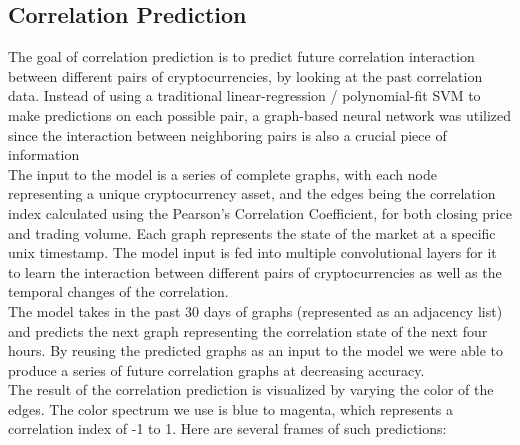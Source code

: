 \documentclass[11pt]{article}
\begin{document}
\subsection{Correlation Prediction}
The goal of correlation prediction is to predict future correlation interaction between different pairs of cryptocurrencies, by looking at the past correlation data. Instead of using a traditional linear-regression / polynomial-fit SVM to make predictions on each possible pair, a graph-based neural network was utilized since the interaction between neighboring pairs is also a crucial piece of information\\[2mm]
The input to the model is a series of complete graphs, with each node representing a unique cryptocurrency asset, and the edges being the correlation index calculated using the Pearson’s Correlation Coefficient, for both closing price and trading volume. Each graph represents the state of the market at a specific unix timestamp. The model input is fed into multiple convolutional layers for it to learn the interaction between different pairs of cryptocurrencies as well as the temporal changes of the correlation.\\[2mm]
The model takes in the past 30 days of graphs (represented as an adjacency list) and predicts the next graph representing the correlation state of the next four hours. By reusing the predicted graphs as an input to the model we were able to produce a series of future correlation graphs at decreasing accuracy.\\[2mm]
The result of the correlation prediction is visualized by varying the color of the edges. The color spectrum we use is blue to magenta, which represents a correlation index of -1 to 1. Here are several frames of such predictions:\\[2mm]
\end{document}
